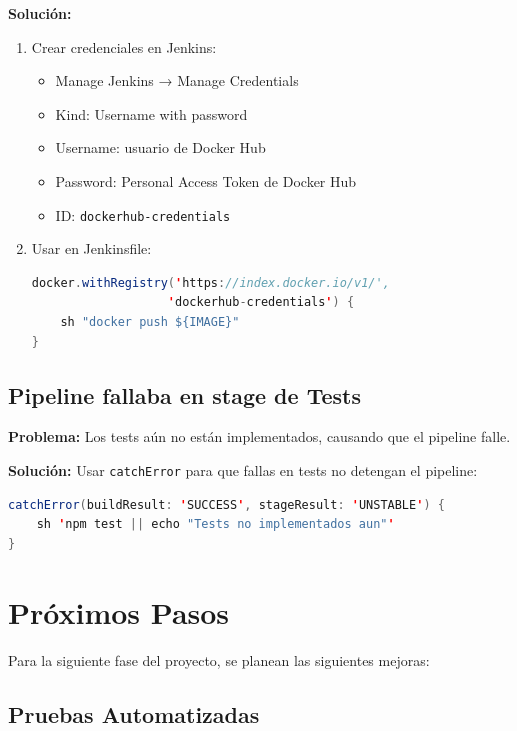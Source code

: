\documentclass[12pt,a4paper]{article}
\begin{document}
\textbf{Solución:}
\begin{enumerate}
    \item Crear credenciales en Jenkins:
    \begin{itemize}
        \item Manage Jenkins → Manage Credentials
        \item Kind: Username with password
        \item Username: usuario de Docker Hub
        \item Password: Personal Access Token de Docker Hub
        \item ID: \texttt{dockerhub-credentials}
    \end{itemize}
    
    \item Usar en Jenkinsfile:
    \begin{lstlisting}[language=Java]
docker.withRegistry('https://index.docker.io/v1/', 
                   'dockerhub-credentials') {
    sh "docker push ${IMAGE}"
}
    \end{lstlisting}
\end{enumerate}

\subsection{Pipeline fallaba en stage de Tests}

\textbf{Problema:} Los tests aún no están implementados, causando que el pipeline falle.

\textbf{Solución:} Usar \texttt{catchError} para que fallas en tests no detengan el pipeline:

\begin{lstlisting}[language=Java]
catchError(buildResult: 'SUCCESS', stageResult: 'UNSTABLE') {
    sh 'npm test || echo "Tests no implementados aun"'
}
\end{lstlisting}

\newpage

\section{Próximos Pasos}

Para la siguiente fase del proyecto, se planean las siguientes mejoras:

\subsection{Pruebas Automatizadas}
\end{document}
